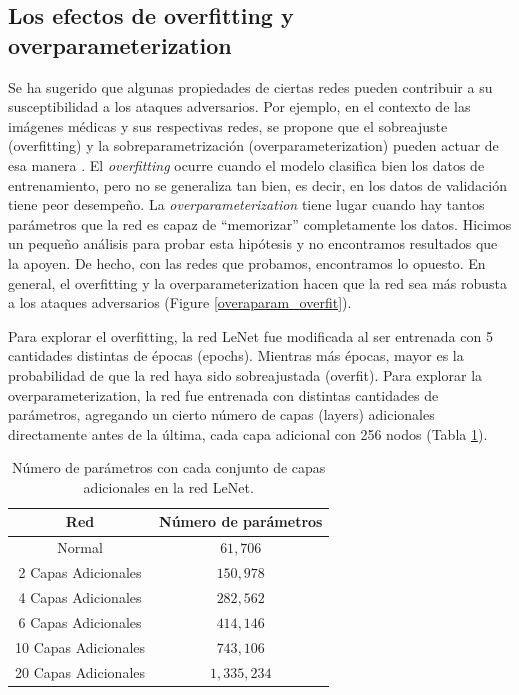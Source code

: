 \pagebreak

\subsection{Los efectos de overfitting y overparameterization}

Se ha sugerido que algunas propiedades de ciertas redes pueden contribuir a su susceptibilidad a los ataques adversarios. Por ejemplo, en el contexto de las imágenes médicas y sus respectivas redes, se propone que el sobreajuste (overfitting) y la sobreparametrización (overparameterization) pueden actuar de esa manera \cite{ma2020understanding}. El \textit{overfitting} ocurre cuando el modelo clasifica bien los datos de entrenamiento, pero no se generaliza tan bien, es decir, en los datos de validación tiene peor desempeño. La \textit{overparameterization} tiene lugar cuando hay tantos parámetros que la red es capaz de ``memorizar'' completamente los datos. Hicimos un pequeño análisis para probar esta hipótesis y no encontramos resultados que la apoyen. De hecho, con las redes que probamos, encontramos lo opuesto. En general, el overfitting y la overparameterization hacen que la red sea más robusta a los ataques adversarios (Figure \ref{overaparam_overfit}).

Para explorar el overfitting, la red LeNet fue modificada al ser entrenada con 5 cantidades distintas de épocas (epochs). Mientras más épocas, mayor es la probabilidad de que la red haya sido sobreajustada (overfit). Para explorar la overparameterization, la red fue entrenada con distintas cantidades de parámetros, agregando un cierto número de capas (layers) adicionales directamente antes de la última, cada capa adicional con 256 nodos (Tabla \ref{overparam_table}).

\renewcommand{\tablename}{Tabla}
\begin{table}[h!]
    \centering
    \begin{tabular}{|c|c|}
     \hline
     Red & Número de parámetros  \\ 
     \hline
     Normal & $61,706$  \\ 
     \hline
     2 Capas Adicionales & $150,978$  \\ 
     \hline
     4 Capas Adicionales & $282,562$  \\ 
     \hline
     6 Capas Adicionales & $414,146$  \\ 
     \hline
     10 Capas Adicionales & $743,106$  \\ 
     \hline
     20 Capas Adicionales & $1,335,234$  \\ 
     \hline
    \end{tabular}
    \caption{Número de parámetros con cada conjunto de capas adicionales en la red LeNet.}
    \label{overparam_table}
\end{table}

